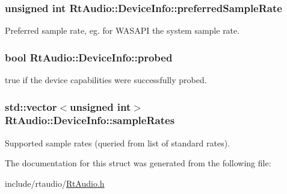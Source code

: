 \subsubsection[{preferred\+Sample\+Rate}]{\setlength{\rightskip}{0pt plus 5cm}unsigned int Rt\+Audio\+::\+Device\+Info\+::preferred\+Sample\+Rate}\hypertarget{struct_rt_audio_1_1_device_info_ae9f35de296b33ae1f4e7baab8fd3be6e}{}\label{struct_rt_audio_1_1_device_info_ae9f35de296b33ae1f4e7baab8fd3be6e}
Preferred sample rate, eg. for W\+A\+S\+A\+PI the system sample rate. 
\subsubsection[{probed}]{\setlength{\rightskip}{0pt plus 5cm}bool Rt\+Audio\+::\+Device\+Info\+::probed}\hypertarget{struct_rt_audio_1_1_device_info_a97573717ccb1e75a834a0a108cd6982d}{}\label{struct_rt_audio_1_1_device_info_a97573717ccb1e75a834a0a108cd6982d}
true if the device capabilities were successfully probed. 
\subsubsection[{sample\+Rates}]{\setlength{\rightskip}{0pt plus 5cm}std\+::vector$<$unsigned int$>$ Rt\+Audio\+::\+Device\+Info\+::sample\+Rates}\hypertarget{struct_rt_audio_1_1_device_info_afa65f5f92f66ce7aacd3ff35e11b230f}{}\label{struct_rt_audio_1_1_device_info_afa65f5f92f66ce7aacd3ff35e11b230f}
Supported sample rates (queried from list of standard rates). 

The documentation for this struct was generated from the following file\+:\begin{DoxyCompactItemize}
\item 
include/rtaudio/\hyperlink{_rt_audio_8h}{Rt\+Audio.\+h}\end{DoxyCompactItemize}
